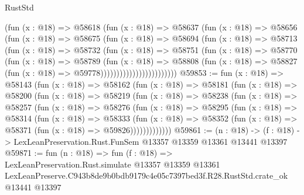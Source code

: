 \begin{lexlean}{RustStd}
\begin{coremodule}
                          (fun (x : @18) =>
                          @58618
                            (fun (x : @18) =>
                            @58637
                              (fun (x : @18) =>
                              @58656
                                (fun (x : @18) =>
                                @58675
                                  (fun (x : @18) =>
                                  @58694
                                    (fun (x : @18) =>
                                    @58713
                                      (fun (x : @18) =>
                                      @58732
                                        (fun (x : @18) =>
                                        @58751
                                          (fun (x : @18) =>
                                          @58770
                                            (fun (x : @18) =>
                                            @58789
                                              (fun (x : @18) =>
                                              @58808
                                                (fun (x : @18) =>
                                                @58827
                                                  (fun (x : @18) => @59778))))))))))))))))))))))))
@59853 := fun (x : @18) =>
  @58143
    (fun (x : @18) =>
    @58162
      (fun (x : @18) =>
      @58181
        (fun (x : @18) =>
        @58200
          (fun (x : @18) =>
          @58219
            (fun (x : @18) =>
            @58238
              (fun (x : @18) =>
              @58257
                (fun (x : @18) =>
                @58276
                  (fun (x : @18) =>
                  @58295
                    (fun (x : @18) =>
                    @58314
                      (fun (x : @18) =>
                      @58333
                        (fun (x : @18) =>
                        @58352 (fun (x : @18) => @58371 (fun (x : @18) => @59826)))))))))))))
@59861 := (n : @18) ->
  (f : @18) -> LexLeanPreservation.Rust.FunSem @13357 @13359 @13361 @13441 @13397
@59871 := fun (n : @18) =>
  fun (f : @18) =>
  LexLeanPreservation.Rust.simulate
    @13357
    @13359
    @13361
    LexLeanPreserve.C943b8de9b0bdb9179c4e05c7397bed3f.R28.RustStd.crate_ok
    @13441
    @13397
\end{coremodule}
\end{lexlean}
